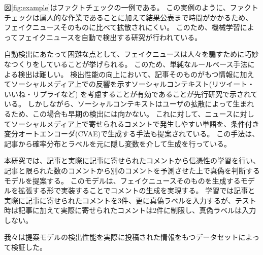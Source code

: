 図\ref{fig:example}はファクトチェックの一例である\cite{gillin_2017}。
この実例のように、ファクトチェックは属人的な作業であることに加えて結果公表まで時間がかかるため、
フェイクニュースそのものに比べて拡散されにくい。
このため、機械学習によってフェイクニュースを自動で検出する研究が行われている。

自動検出にあたって困難な点として、フェイクニュースは人々を騙すために巧妙なつくりをしていることが挙げられる。
このため、単純なルールベース手法による検出は難しい。
検出性能の向上において、記事そのものがもつ情報に加えてソーシャルメディア上での反響を示すソーシャルコンテキスト(リツイート・いいね・リプライなど)
を考慮することが有効であることが先行研究で示されている\cite{Guo:2018:RDH:3269206.3271709}。
しかしながら、ソーシャルコンテキストはユーザの拡散によって生まれるため、この場合も早期の検出には向かない。
これに対して、ニュースに対してソーシャルメディア上で寄せられるコメントで発生しやすい単語を、条件付き変分オートエンコーダ(CVAE)で生成する手法も提案されている\cite{ijcai2018-533}。
この手法は、記事から確率分布とラベルを元に隠し変数を介して生成を行っている。

本研究では、記事と実際に記事に寄せられたコメントから信憑性の学習を行い、記事と限られた数のコメントから別のコメントを予測させた上で真偽を判断するモデルを提案する。
このモデルは、フェイクニュースそのものを生成するモデル\cite{NIPS2019_9106}を拡張する形で実装することでコメントの生成を実現する。
学習では記事と実際に記事に寄せられたコメントを3件、更に真偽ラベルを入力するが、テスト時は記事に加えて実際に寄せられたコメントは2件に制限し、真偽ラベルは入力しない。

我々は提案モデルの検出性能を実際に投稿された情報をもつデータセットによって検証した。

